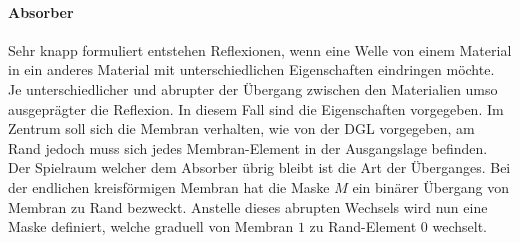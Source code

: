 \paragraph{Absorber}
Sehr knapp formuliert entstehen Reflexionen, wenn eine Welle von einem Material in ein anderes Material mit unterschiedlichen Eigenschaften eindringen möchte.
Je unterschiedlicher und abrupter der Übergang zwischen den Materialien umso ausgeprägter die Reflexion.
In diesem Fall sind die Eigenschaften vorgegeben.
Im Zentrum soll sich die Membran verhalten, wie von der DGL vorgegeben, am Rand jedoch muss sich jedes Membran-Element in der Ausgangslage befinden. 
Der Spielraum welcher dem Absorber übrig bleibt ist die Art der Überganges.
Bei der endlichen kreisförmigen Membran hat die Maske $M$ ein binärer Übergang von Membran zu Rand bezweckt.
Anstelle dieses abrupten Wechsels wird nun eine Maske definiert, welche graduell von Membran $1$ zu Rand-Element $0$ wechselt.













